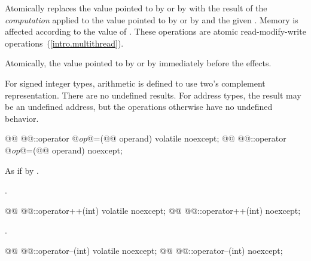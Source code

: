 \begin{itemdescr}
\pnum
\effects Atomically replaces the value pointed to by  or by
 with the result of the \textit{computation} applied to the
value pointed to by  or by  and the given .
Memory is affected according to the value of .
These operations are atomic read-modify-write operations~(\ref{intro.multithread}).

\pnum
\returns Atomically, the value pointed to by  or by  immediately before the effects.

%
\pnum
\remark For signed integer types, arithmetic is defined to use two's complement
representation. There are no undefined results. For address types, the result may be an
undefined address, but the operations otherwise have no undefined behavior.
\end{itemdescr}

%
\begin{itemdecl}
@@ @@::operator @\textit{op}@=(@@ operand) volatile noexcept;
@@ @@::operator @\textit{op}@=(@@ operand) noexcept;
\end{itemdecl}

\begin{itemdescr}
\pnum
\effects As if by .

\pnum
\returns {}.
\end{itemdescr}

%
\begin{itemdecl}
@@ @@::operator++(int) volatile noexcept;
@@ @@::operator++(int) noexcept;
\end{itemdecl}

\begin{itemdescr}
\pnum
\returns {}.
\end{itemdescr}

%
\begin{itemdecl}
@@ @@::operator--(int) volatile noexcept;
@@ @@::operator--(int) noexcept;
\end{itemdecl}


